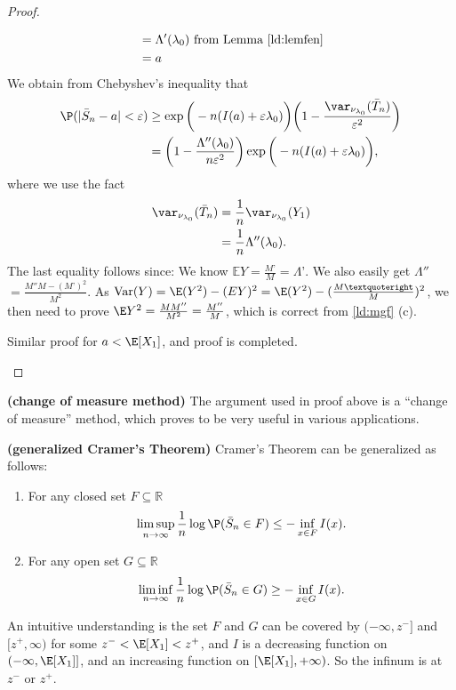 \documentclass{article}
\newcommand{\bfs}[1]{\textbf{({#1})}}
\begin{document}
\begin{proof}
\begin{enumerate}[label=(\roman*)]
\begin{align*}
			&=\Lambda'(\lambda_0) \ \mbox{from Lemma \cref{ld:lemfen}}\\
			&=a
			\end{align*}
			We obtain from Chebyshev's inequality that 
			\begin{align*}
			\P(|\bar{S}_n-a|<\varepsilon)
			&\geq\exp\bigg(-n(I(a)+\varepsilon\lambda_0)\bigg)\bigg(1-\frac{\var_{\nu_{\lambda_0}}(\bar{T}_n)}{\varepsilon^{2}}\bigg)\\
			&=\bigg(1-\frac{\Lambda''(\lambda_0)}{n\varepsilon^2}\bigg)\exp\bigg(-n(I(a)+\varepsilon\lambda_0)\bigg),
			\end{align*}
			where we use the fact 
			\begin{align*}
			\var_{\nu_{\lambda_0}}(\bar{T}_n)
			&=\frac{1}{n} \var_{\nu_{\lambda_0}}(Y_1)\\
			&=\frac{1}{n}\Lambda''(\lambda_0).
			\end{align*}
			The last equality follows since: We know $\mathbb{E}Y = \frac{M’}{M}=\Lambda’$.
We also easily get $\Lambda''$ $=\frac{M''M-(M’)^2}{M^2}$. As $\mathrm{Var}(Y) = \E (Y^2)- (EY)^2=\E (Y^2) - (\frac{M’}{M})^2$, we then need to prove $\E Y^2 = \frac{MM''}{M^2}=\frac{M''}{M}$, which is correct from \cref{ld:mgf} (c).

			Similar proof for $a<\E[X_1]$, and proof is completed.  
	\end{enumerate}  
\end{proof}

\begin{rema}{\bfs{change of measure method}}
The argument used in proof above is a ``change of measure'' method, which proves to be very useful in various applications.
\end{rema}
\begin{rema}{\bfs{generalized Cramer's Theorem}}
Cramer's Theorem can be generalized as follows:
\begin{enumerate}[label=(\roman*)]
\item For any closed set $F\subseteq\mathbb{R}$
	\begin{align*}
	\limsup\limits_{n\rightarrow\infty}\frac{1}{n}\log\P(\bar{S}_n\in F)\leq-\inf\limits_{x\in F}I(x).
	\end{align*}
\item For any open set $G\subseteq\mathbb{R}$
	\begin{align*}
	\liminf\limits_{n\rightarrow\infty}\frac{1}{n}\log\P(\bar{S}_n\in G)\geq-\inf\limits_{x\in G}I(x).
	\end{align*}
\end{enumerate}
An intuitive understanding is the set $F$ and $G$ can be covered by $(-\infty, z^-]$ and $[z^+, \infty) $ for some $z^-<\E[X_1]<z^+$, and $I$ is a decreasing function on $(-\infty, \E[X_1]]$, and an increasing function on  $[\E[X_1], +\infty)$. So the infinum is at $ z^- $ or $ z^+$. 
\end{rema}
\end{document}
